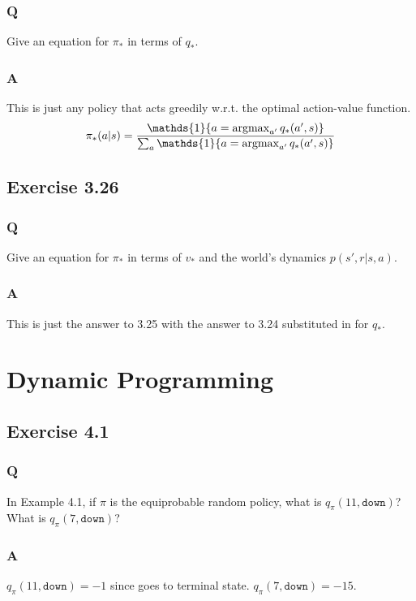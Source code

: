\subsubsection{Q}
Give an equation for $\pi_*$ in terms of $q_*$.

\subsubsection{A}
This is just any policy that acts greedily w.r.t. the optimal action-value function.
\begin{equation}
    \pi_* (a|s) = \frac{\mathds{1}\{a = \argmax_{a'} q_*(a', s)\}}{\sum_{a} \mathds{1}\{a = \argmax_{a'}q_*(a', s)\}}
\end{equation} 

\subsection{Exercise 3.26}
\subsubsection{Q}
Give an equation for $\pi_*$ in terms of $v_*$ and the world's dynamics $p(s', r| s, a)$.

\subsubsection{A}
This is just the answer to 3.25 with the answer to 3.24 substituted in for $q_*$.


\section{Dynamic Programming}

\subsection{Exercise 4.1}
\subsubsection{Q}
In Example 4.1, if $\pi$ is the equiprobable random policy, what is $q_\pi(11, \mathtt{down})$? What is $q_\pi(7, \mathtt{down})$?

\subsubsection{A}
$q_\pi(11, \mathtt{down}) = -1$ since goes to terminal state. $q_\pi(7, \mathtt{down}) = -15$.

